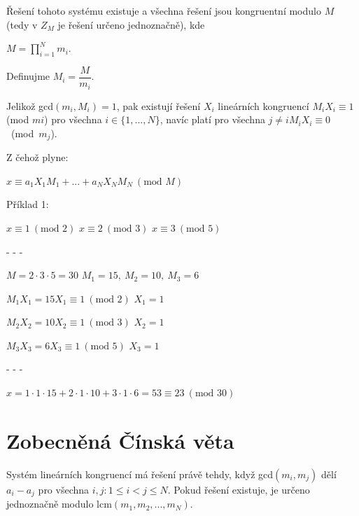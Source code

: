 \documentclass{szzclass}
\begin{document}
Řešení tohoto systému existuje a všechna
řešení jsou kongruentní modulo $M$ (tedy v $Z_M$ je řešení určeno
jednoznačně), kde

\begin{center}
$M = \prod\limits_{i=1}^{N}m_i$.
\end{center}

Definujme $M_i = \dfrac{M}{m_i}$.

Jelikož gcd$(m_i, M_i) = 1$, pak existují řešení $X_i$ lineárních kongruencí
$M_iX_i \equiv 1$ (mod $mi$) pro všechna $i \in \{1, . . . , N\}$,
navíc platí pro všechna $j \neq i$\linebreak$M_iX_i \equiv 0$\nolinebreak~(mod\nolinebreak~$m_j$).

Z čehož plyne:
\begin{center}
$x \equiv a_1X_1M_1 + . . . + a_N X_NM_N~(\text{mod }M)$
\end{center}

Příklad 1:
\begin{center}
$x \equiv 1~(\text{mod } 2)$\linebreak
$x \equiv 2~(\text{mod } 3)$\linebreak
$x \equiv 3~(\text{mod } 5)$

- - -

$M = 2\cdot 3 \cdot 5 = 30$\linebreak
$M_1 = 15,~M_2=10,~M_3=6$

$M_1X_1 = 15X_1 \equiv 1~(\text{mod }2)$\linebreak
$X_1 = 1$

$M_2X_2 = 10X_2 \equiv 1~(\text{mod }3)$\linebreak
$X_2 = 1$

$M_3X_3 = 6X_3 \equiv 1~(\text{mod }5)$\linebreak
$X_3 = 1$

- - -

$x = 1 \cdot 1 \cdot 15 + 2 \cdot 1 \cdot 10 + 3  \cdot 1  \cdot 6 = 53 \equiv 23~(\text{mod }30)$

\end{center}


\section{Zobecněná Čínská věta}

Systém lineárních kongruencí má řešení právě tehdy, když gcd$(m_i, m_j)$ dělí $a_i - a_j$ pro všechna
$i, j : 1 \leq i < j \leq N$. Pokud řešení existuje, je určeno jednoznačně modulo lcm$(m_1, m_2, . . . , m_N)$.
\end{document}
